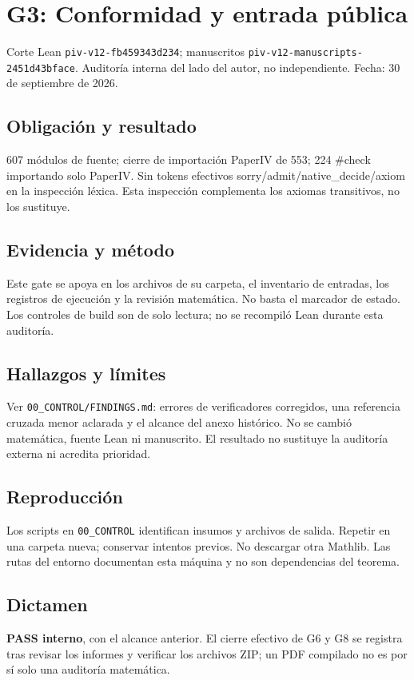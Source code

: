 \section{G3: Conformidad y entrada
pública}\label{g3-conformidad-y-entrada-puxfablica}

Corte Lean \texttt{piv-v12-fb459343d234}; manuscritos
\texttt{piv-v12-manuscripts-2451d43bface}. Auditoría interna del lado
del autor, no independiente. Fecha: 30 de septiembre de 2026.

\subsection{Obligación y resultado}\label{obligaciuxf3n-y-resultado}

607 módulos de fuente; cierre de importación PaperIV de 553; 224 \#check
importando solo PaperIV. Sin tokens efectivos
sorry/admit/native\_decide/axiom en la inspección léxica. Esta
inspección complementa los axiomas transitivos, no los sustituye.

\subsection{Evidencia y método}\label{evidencia-y-muxe9todo}

Este gate se apoya en los archivos de su carpeta, el inventario de
entradas, los registros de ejecución y la revisión matemática. No basta
el marcador de estado. Los controles de build son de solo lectura; no se
recompiló Lean durante esta auditoría.

\subsection{Hallazgos y límites}\label{hallazgos-y-luxedmites}

Ver \texttt{00\_CONTROL/FINDINGS.md}: errores de verificadores
corregidos, una referencia cruzada menor aclarada y el alcance del anexo
histórico. No se cambió matemática, fuente Lean ni manuscrito. El
resultado no sustituye la auditoría externa ni acredita prioridad.

\subsection{Reproducción}\label{reproducciuxf3n}

Los scripts en \texttt{00\_CONTROL} identifican insumos y archivos de
salida. Repetir en una carpeta nueva; conservar intentos previos. No
descargar otra Mathlib. Las rutas del entorno documentan esta máquina y
no son dependencias del teorema.

\subsection{Dictamen}\label{dictamen}

\textbf{PASS interno}, con el alcance anterior. El cierre efectivo de G6
y G8 se registra tras revisar los informes y verificar los archivos ZIP;
un PDF compilado no es por sí solo una auditoría matemática.
